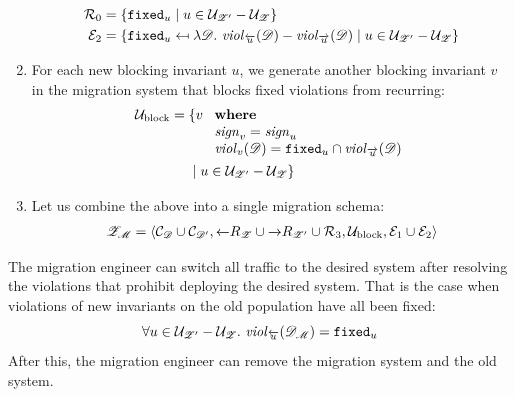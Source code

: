 \documentclass[runningheads]{llncs}
\newcommand{\id}[1]{\text{\it #1\/}}
\newcommand{\viol}[2]{\violC{#1}(#2)}
\newcommand{\violC}[1]{\id{viol}_{#1}}
\newcommand{\sign}[1]{\id{sign}_{#1}}
\newcommand{\quadruple}[4]{\langle{#1},{#2},{#3},{#4}\rangle}
\newcommand{\concepts}{\mathcal{C}}
\newcommand{\rels}{\mathcal{R}}   %
\newcommand{\transactions}{\mathcal{E}}
\newcommand{\rules}{\mathcal{U}}
\newcommand{\dataset}{\mathscr{D}}
\newcommand{\schema}{\mathscr{Z}}
\newcommand{\migrsys}{\mathscr{M}}
\begin{document}
\begin{enumerate}
   \begin{align}
      \rels_\theenumi={}&\{{\tt fixed}_u\mid u \in \rules_{\schema'}-\rules_{\schema}\}\\
      \transactions_2={}&\{{\tt fixed}_u\mapsfrom\lambda\dataset.~\viol{\overleftarrow{u}}{\dataset}-\viol{\overrightarrow{u}}{\dataset}\mid u\in\rules_{\schema'}-\rules_{\schema}\}\label{eqn:enforceForRules}
   \end{align}
\item For each new blocking invariant $u$, we generate another blocking invariant $v$ in the migration system that blocks fixed violations from recurring:
   \begin{align}
      \rules_\text{block}={}&\{v\ 
      \begin{array}[t]{l}
         \text{\bf where}\\
         \sign{v}=\sign{u}\\
         \viol{v}{\dataset}={\tt fixed}_u\cap\viol{\overrightarrow{u}}{\dataset}
      \end{array}\\
      &\mid u\in\rules_{\schema'}-\rules_{\schema}\}\notag
   \end{align}
\item Let us combine the above into a single migration schema:
   \begin{align}
      \schema_\migrsys=\quadruple{\concepts_\dataset\cup\concepts_{\dataset'}}{\overleftarrow\rels_{\schema}\cup\overrightarrow\rels_{\schema'}\cup\rels_3}{\rules_\text{block}}{\transactions_1\cup\transactions_2}
   \end{align}
\end{enumerate}
   The migration engineer can switch all traffic to the desired system
   after resolving the violations that prohibit deploying the desired system.
   That is the case when violations of new invariants on the old population have all been fixed:
\begin{equation}
   \forall u\in\rules_{\schema'}-\rules_{\schema}.\ \viol{\overleftarrow{u}}{\dataset_\migrsys}={\tt fixed}_u
\end{equation}
   After this, the migration engineer can remove the migration system and the old system.
\end{document}
